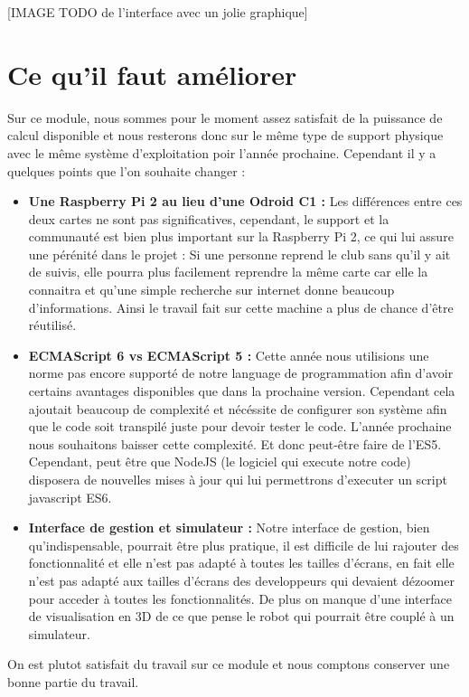 	[IMAGE TODO de l'interface avec un jolie graphique]

	\section{Ce qu'il faut améliorer}
	Sur ce module, nous sommes pour le moment assez satisfait de la puissance de calcul disponible et nous resterons donc sur le même type de support physique avec le même système d'exploitation poir l'année prochaine. Cependant il y a quelques points que l'on souhaite changer :

	\begin{itemize}
		\item \textbf{Une Raspberry Pi 2 au lieu d'une Odroid C1 :} Les différences entre ces deux cartes ne sont pas significatives, cependant, le support et la communauté est bien plus important sur la Raspberry Pi 2, ce qui lui assure une pérénité dans le projet : Si une personne reprend le club sans qu'il y ait de suivis, elle pourra plus facilement reprendre la même carte car elle la connaitra et qu'une simple recherche sur internet donne beaucoup d'informations. Ainsi le travail fait sur cette machine a plus de chance d'être réutilisé.
		\item \textbf{ECMAScript 6 vs ECMAScript 5 :} Cette année nous utilisions une norme pas encore supporté de notre language de programmation afin d'avoir certains avantages disponibles que dans la prochaine version. Cependant cela ajoutait beaucoup de complexité et nécéssite de configurer son système afin que le code soit transpilé juste pour devoir tester le code. L'année prochaine nous souhaitons baisser cette complexité. Et donc peut-être faire de l'ES5. Cependant, peut être que NodeJS (le logiciel qui execute notre code) disposera de nouvelles mises à jour qui lui permettrons d'executer un script javascript ES6.
		\item \textbf{Interface de gestion et simulateur :} Notre interface de gestion, bien qu'indispensable, pourrait être plus pratique, il est difficile de lui rajouter des fonctionnalité et elle n'est pas adapté à toutes les tailles d'écrans, en fait elle n'est pas adapté aux tailles d'écrans des developpeurs qui devaient dézoomer pour acceder à toutes les fonctionnalités. De plus on manque d'une interface de visualisation en 3D de ce que pense le robot qui pourrait être couplé à un simulateur.
	\end{itemize}
	On est plutot satisfait du travail sur ce module et nous comptons conserver une bonne partie du travail.